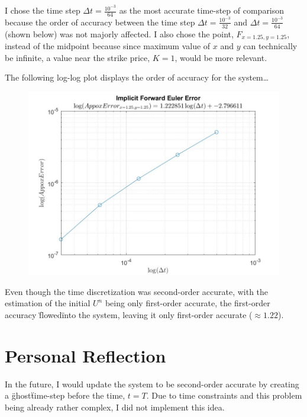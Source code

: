 \documentclass[12pt,letterpaper]{article}
\begin{document}
I chose the time step $\Delta t = \frac{10^{-3}}{64}$ as the most accurate time-step of comparison because the order of accuracy between the time step $\Delta t = \frac{10^{-3}}{32}$ and $\Delta t = \frac{10^{-3}}{64}$ (shown below) was not majorly affected. 
I also chose the point, $F_{x=1.25, y=1.25}$, instead of the midpoint because since maximum value of $x$ and $y$ can technically be infinite, a value near the strike price, $K=1$, would be more relevant.

The following log-log plot displays the order of accuracy for the system\ldots

\newpage

\begin{figure}[!h]
    \centering
    \includegraphics[width=1\linewidth]{error_plot.jpg}\label{fig:Error Plot}
\end{figure}

Even though the time discretization was second-order accurate, with the estimation of the initial $U^{n}$ being only first-order accurate, the first-order accuracy \"flowed\" into the system, leaving it only first-order accurate ($\approx 1.22$).

\section*{Personal Reflection}

In the future, I would update the system to be second-order accurate by creating a \"ghost\" time-step before the time, $t=T$. Due to time constraints and this problem being already rather complex, I did not implement this idea.
\end{document}
